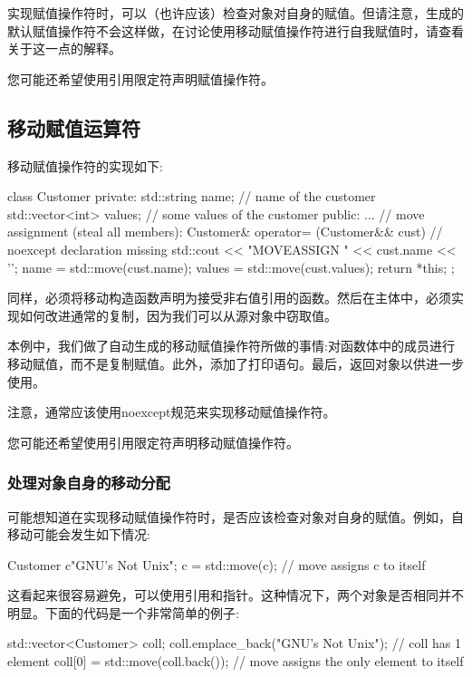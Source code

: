 实现赋值操作符时，可以（也许应该）检查对象对自身的赋值。但请注意，生成的默认赋值操作符不会这样做，在讨论使用移动赋值操作符进行自我赋值时，请查看关于这一点的解释。

您可能还希望使用引用限定符声明赋值操作符。

\subsection{移动赋值运算符}

移动赋值操作符的实现如下:

\begin{cppcode}
class Customer {
	private:
	std::string name; // name of the customer
	std::vector<int> values; // some values of the customer
	public:
	...
	// move assignment (steal all members):
	Customer& operator= (Customer&& cust) { // noexcept declaration missing
		std::cout << "MOVEASSIGN " << cust.name << '\n';
		name = std::move(cust.name);
		values = std::move(cust.values);
		return *this;
	}
};
\end{cppcode}

同样，必须将移动构造函数声明为接受非右值引用的函数。然后在主体中，必须实现如何改进通常的复制，因为我们可以从源对象中窃取值。

本例中，我们做了自动生成的移动赋值操作符所做的事情:对函数体中的成员进行移动赋值，而不是复制赋值。此外，添加了打印语句。最后，返回对象以供进一步使用。

注意，通常应该使用noexcept规范来实现移动赋值操作符。

您可能还希望使用引用限定符声明移动赋值操作符。

\subsubsection{处理对象自身的移动分配}

可能想知道在实现移动赋值操作符时，是否应该检查对象对自身的赋值。例如，自移动可能会发生如下情况:

\begin{cppcode}
Customer c{"GNU's Not Unix"};
c = std::move(c); // move assigns c to itself
\end{cppcode}

这看起来很容易避免，可以使用引用和指针。这种情况下，两个对象是否相同并不明显。下面的代码是一个非常简单的例子:

\begin{cppcode}
std::vector<Customer> coll;
coll.emplace_back("GNU's Not Unix"); // coll has 1 element
coll[0] = std::move(coll.back()); // move assigns the only element to itself
\end{cppcode}

